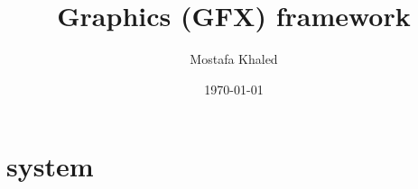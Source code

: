 \documentclass{article}
\title{Graphics (GFX) framework}
\author{Mostafa Khaled}
\date{\today}
\begin{document}
  \maketitle
  \pagebreak
  \tableofcontents

  

  \section{system}
  
  
  
  
  
  
  
\end{document}
